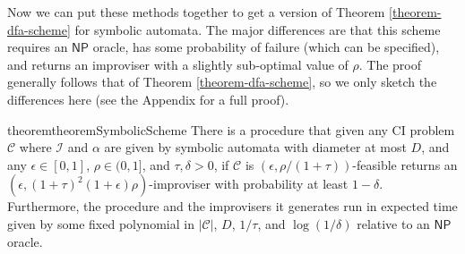 \documentclass[a4paper,USenglish,numberwithinsect]{lipics}
\theoremstyle{plain}
\theoremstyle{definition}
\newcommand{\NP}{\ensuremath{\mathsf{NP}}}
\newcommand{\improvs}{I}
\begin{document}
Now we can put these methods together to get a version of Theorem \ref{theorem-dfa-scheme} for symbolic automata. The major differences are that this scheme requires an {\NP} oracle, has some probability of failure (which can be specified), and returns an improviser with a slightly sub-optimal value of $\rho$. The proof generally follows that of Theorem \ref{theorem-dfa-scheme}, so we only sketch the differences here (see the Appendix for a full proof).
\begin{restatable}{theorem}{theoremSymbolicScheme}
There is a procedure that given any CI problem $\mathcal{C}$ where $\mathcal{\improvs}$ and $\alpha$ are given by symbolic automata with diameter at most $D$, and any $\epsilon \in [0,1]$, $\rho \in (0,1]$, and $\tau, \delta > 0$, if $\mathcal{C}$ is $(\epsilon, \rho/(1+\tau))$-feasible returns an $(\epsilon, (1+\tau)^2 (1+\epsilon) \rho)$-improviser with probability at least $1-\delta$. Furthermore, the procedure and the improvisers it generates run in expected time given by some fixed polynomial in $|\mathcal{C}|$, $D$, $1/\tau$, and $\log(1/\delta)$ relative to an {\NP} oracle.
\end{restatable}
\end{document}
